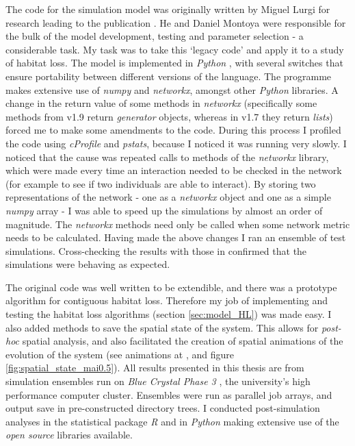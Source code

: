 The code for the simulation model was originally written by Miguel Lurgi for research leading to the publication \cite{lurgi2015effects}. He and Daniel Montoya were responsible for the bulk of the model development, testing and parameter selection - a considerable task. My task was to take this `legacy code' and apply it to a study of habitat loss. The model is implemented in \emph{Python} \cite{python}, with several switches that ensure portability between different versions of the language. The programme makes extensive use of \emph{numpy} and \emph{networkx}, amongst other \emph{Python} libraries. A change in the return value of some methods in \emph{networkx} (specifically some methods from v1.9 return \emph{generator} objects, whereas in v1.7 they return \emph{lists}) forced me to make some amendments to the code. During this process I profiled the code using \emph{cProfile} and \emph{pstats}, because I noticed it was running very slowly. I noticed that the cause was repeated calls to methods of the \emph{networkx} library, which were made every time an interaction needed to be checked in the network (for example to see if two individuals are able to interact). By storing two representations of the network - one as a \emph{networkx} object and one as a simple \emph{numpy} array - I was able to speed up the simulations by almost an order of magnitude. The \emph{networkx} methods need only be called when some network metric needs to be calculated. Having made the above changes I ran an ensemble of test simulations. Cross-checking the results with those in \cite{lurgi2015effects} confirmed that the simulations were behaving as expected.    

The original code was well written to be extendible, and there was a prototype algorithm for contiguous habitat loss. Therefore my job of implementing and testing the habitat loss algorithms (section \ref{sec:model_HL}) was made easy. I also added methods to save the spatial state of the system. This allows for \emph{post-hoc} spatial analysis, and also facilitated the creation of spatial animations of the evolution of the system (see animations at \cite{mcwilliams2015anim}, and figure \ref{fig:spatial_state_mai0.5}). All results presented in this thesis are from simulation ensembles run on \emph{Blue Crystal Phase 3} \cite{BC3}, the university's high performance computer cluster. Ensembles were run as parallel job arrays, and output save in pre-constructed directory trees. I conducted post-simulation analyses in the statistical package \emph{R} \cite{Rlanguage} and in \emph{Python} making extensive use of the \emph{open source} libraries available.


